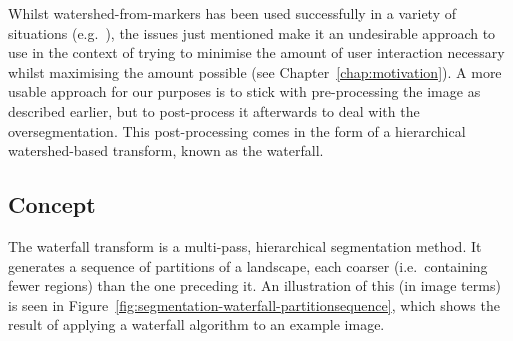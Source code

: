 Whilst watershed-from-markers has been used successfully in a variety of situations (e.g.~\cite{chae07,gonzalez07}), the issues just mentioned make it an undesirable approach to use in the context of trying to minimise the amount of user interaction necessary whilst maximising the amount possible (see Chapter~\ref{chap:motivation}). A more usable approach for our purposes is to stick with pre-processing the image as described earlier, but to post-process it afterwards to deal with the oversegmentation. This post-processing comes in the form of a hierarchical watershed-based transform, known as the waterfall.

\subsection{Concept}

The waterfall transform is a multi-pass, hierarchical segmentation method. It generates a sequence of partitions of a landscape, each coarser (i.e.~containing fewer regions) than the one preceding it. An illustration of this (in image terms) is seen in Figure~\ref{fig:segmentation-waterfall-partitionsequence}, which shows the result of applying a waterfall algorithm to an example image.


